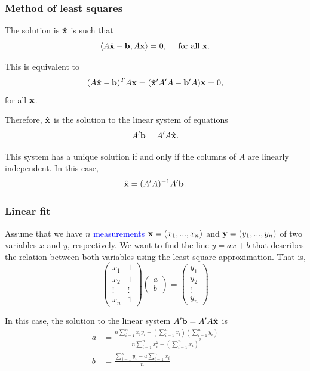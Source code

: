 \documentclass[11pt,aspectratio=169]{beamer}
\begin{document}
\begin{frame}
\frametitle{Method of least squares}
\begin{small}
The solution is $\hat{{\bf x}}$ is such that
$$
\langle A\hat{{\bf x}}-{\bf b},  A{\bf x}\rangle=0, \quad \text{ for all } {\bf x}.
$$

 This is equivalent to
$$
(A\hat{{\bf x}}-{\bf b})^T A{\bf x}=(\hat{{\bf  x}}' A' A -{\bf b}' A ) {\bf x}=0,
$$
for all ${\bf x}$.
\vskip 10pt

Therefore, $\hat{{\bf x}}$ is the solution to the linear system of equations
$$
A' {\bf b}= A'  A \hat{{\bf x}}.
$$

\begin{tiny} This system has a unique solution if and only if the columns of $A$ are linearly independent. In this case, 
$$
\hat{{\bf  x}}=(A' A)^{-1} A' {\bf b}.
$$
\end{tiny}


\end{small}
\end{frame}



\begin{frame}
\frametitle{Linear fit }
\begin{small}
Assume that we have $n$ \textcolor{blue}{measurements}
${\bf x}=(x_1,...,x_n)$ and ${\bf y}=(y_1,...,y_n)$ of two variables $x$ and $y$, respectively.
\vskip 12pt
We want to find the line $y=ax+b$ that describes the relation between both variables using the least square approximation. That is, 
\begin{equation*}
\begin{pmatrix}
x_1 & 1\\
x_2 & 1 \\
\vdots & \vdots \\
x_n& 1 
\end{pmatrix} \begin{pmatrix}
a\\
b  
\end{pmatrix} =\begin{pmatrix}
y_1\\
y_2 \\
\vdots\\
y_n 
\end{pmatrix}
\end{equation*} 

In this case, the solution to the linear system $
A' {\bf b}= A'  A \hat{{\bf  x}}
$ is
\begin{equation*} \begin{split}
a&=\frac{n \sum_{i=1}^n x_i y_i-\left(\sum_{i=1}^n x_i\right) \left( \sum_{i=1}^n y_i\right)}{n \sum_{i=1}^n x_i^2-\left( \sum_{i=1}^n x_i\right)^2} \\
b&=\frac{\sum_{i=1}^n y_i-a \sum_{i=1}^n x_i}{n}
\end{split}
\end{equation*}


\end{small}
\end{frame}
\end{document}
